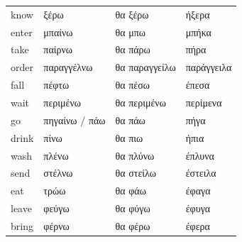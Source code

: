 \documentclass[12pt]{article}
\newcommand{\my}[1]{\textcolor{gray!80!white}{#1}}
\newenvironment{page}{\clearpage\normalsize\null\vfill}{\vfill\null}
\begin{document}
\begin{page}
\begin{tabular}{llll}
            \my{know} & ξέρω & θα ξέρω & ήξερα \\
            \my{enter} & μπαίνω & θα μπω & μπήκα \\
            \my{take} & παίρνω & θα πάρω & πήρα \\
            \my{order} & παραγγέλνω & θα παραγγείλω & παράγγειλα \\
            \my{fall} & πέφτω & θα πέσω & έπεσα \\
            \my{wait} & περιμένω & θα περιμένω & περίμενα \\
            \my{go} & πηγαίνω / πάω & θα πάω & πήγα \\
            \my{drink} & πίνω & θα πιω & ήπια \\
            \my{wash} & πλένω & θα πλύνω & έπλυνα \\
            \my{send} & στέλνω & θα στείλω & έστειλα \\
            \my{eat} & τρώω & θα φάω & έφαγα \\
            \my{leave} & φεύγω & θα φύγω & έφυγα \\
            \my{bring} & φέρνω & θα φέρω & έφερα \\
        \end{tabular}
    \end{page}
\end{document}
